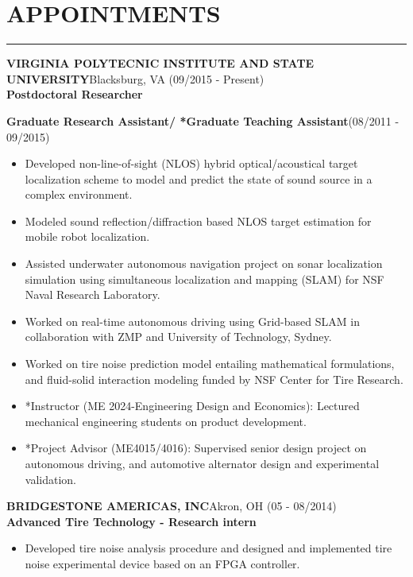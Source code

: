 \documentclass[10pt,letterpaper]{article}
\begin{document}
\section*{APPOINTMENTS}
\vspace{-2mm}
\hrule
\MakeUppercase{\bf Virginia Polytecnic Institute and State University}\hfill{Blacksburg, VA }{(09/2015 - Present)}\\
{\bfseries Postdoctoral Researcher}

{\bfseries Graduate Research Assistant/ *Graduate Teaching Assistant}\hfill {(08/2011 - 09/2015)}\\
\begin{itemize}
\item Developed non-line-of-sight (NLOS) hybrid optical/acoustical target localization scheme to model and predict the state of sound source in a complex environment.
\item Modeled sound reflection/diffraction based NLOS target estimation for mobile robot localization.
\item Assisted underwater autonomous navigation project on sonar localization simulation using simultaneous localization and mapping (SLAM) for NSF Naval Research Laboratory.
\item Worked on real-time autonomous driving using Grid-based SLAM in collaboration with ZMP and University of Technology, Sydney.
\item Worked on tire noise prediction model entailing mathematical formulations, and fluid-solid interaction modeling funded by NSF Center for Tire Research.
\item *Instructor (ME 2024-Engineering Design and Economics): Lectured mechanical engineering students on product development.
\item *Project Advisor (ME4015/4016): Supervised senior design project on autonomous driving, and automotive alternator design and experimental validation. 
\end{itemize}

\MakeUppercase{\bf Bridgestone Americas, Inc}\hfill{Akron, OH}{ (05 - 08/2014)}\\
{\bf Advanced Tire Technology - Research intern}
\begin{itemize}
\item Developed tire noise analysis procedure and designed and implemented tire noise experimental device based on an FPGA controller.
\end{itemize}
\end{document}
